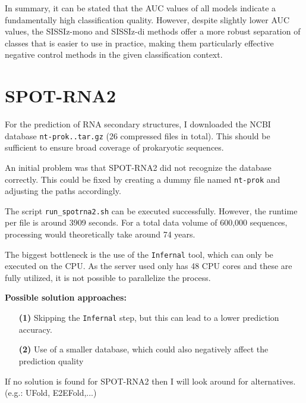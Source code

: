 \documentclass{article}
\begin{document}
\begin{large}
\begin{large}
\begin{large}
In summary, it can be stated that the AUC values of all models indicate a fundamentally high classification quality. However, despite slightly lower AUC values, the SISSIz-mono and SISSIz-di methods offer a more robust separation of classes that is easier to use in practice, making them particularly effective negative control methods in the given classification context.\vspace{1em}

\clearpage

\section{SPOT-RNA2}

For the prediction of RNA secondary structures, I downloaded the NCBI database \texttt{nt-prok.\*.tar.gz} (26 compressed files in total). This should be sufficient to ensure broad coverage of prokaryotic sequences.\vspace{1em}

An initial problem was that SPOT-RNA2 did not recognize the database correctly. This could be fixed by creating a dummy file named \texttt{nt-prok} and adjusting the paths accordingly.\vspace{1em}

The script \texttt{run\_spotrna2.sh} can be executed successfully. However, the runtime per file is around 3909 seconds. For a total data volume of 600,000 sequences, processing would theoretically take around 74 years.\vspace{1em}

The biggest bottleneck is the use of the \texttt{Infernal} tool, which can only be executed on the CPU. As the server used only has 48 CPU cores and these are fully utilized, it is not possible to parallelize the process.\vspace{1em}

\textbf{Possible solution approaches:}\vspace{1em}
\begin{itemize}
    \item[\textbf{(1)}] Skipping the \texttt{Infernal} step, but this can lead to a lower prediction accuracy.
    \item[\textbf{(2)}] Use of a smaller database, which could also negatively affect the prediction quality
\end{itemize}

If no solution is found for SPOT-RNA2 then I will look around for alternatives. (e.g.: UFold, E2EFold,...)


\end{large}
\end{large}
\end{large}
\end{document}
